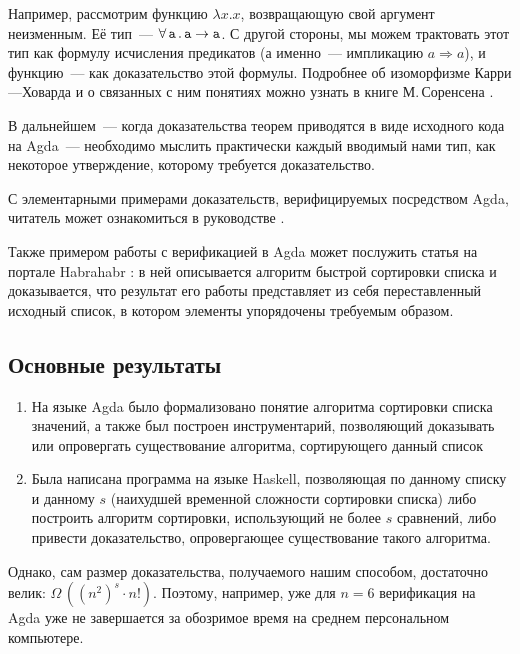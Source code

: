 \abz Например, рассмотрим функцию $\lambda x.x$, возвращающую свой аргумент неизменным. Её тип~— $\mathtt{\forall\,a\,.\,a \rightarrow a}$. С другой стороны, мы можем трактовать этот тип как формулу исчисления предикатов (а именно~— импликацию $a \Rightarrow a$), и функцию~— как доказательство этой формулы. Подробнее об изоморфизме Карри—Ховарда и о связанных с ним понятиях можно узнать в книге М.\,Соренсена \cite{Sorensen}.

\abz В дальнейшем~— когда доказательства теорем приводятся в виде исходного кода на Agda~— необходимо мыслить практически каждый вводимый нами тип, как некоторое утверждение, которому требуется доказательство.

\abz С элементарными примерами доказательств, верифицируемых посредством Agda, читатель может ознакомиться в руководстве \cite{ELTE}.

\abz Также примером работы с верификацией в Agda может послужить статья \linebreak на портале Habrahabr \cite{Habrahabr}: в ней описывается алгоритм быстрой сортировки списка и доказывается, что результат его работы представляет из себя переставленный исходный список, в котором элементы упорядочены требуемым образом.

\subsection
[Основные результаты. Решение задачи и поиск аномалий]
{Основные результаты}

\begin{enumerate}
\item На языке Agda было формализовано понятие алгоритма сортировки списка значений, а также был построен инструментарий, позволяющий доказывать или опровергать существование алгоритма, сортирующего данный список\scolon

\item Была написана программа на языке Haskell, позволяющая по данному списку и данному $s$ (наихудшей временной сложности сортировки списка) либо построить  алгоритм сортировки, использующий не более $s$ сравнений, либо привести доказательство, опровергающее существование такого алгоритма.
\end{enumerate}

Однако, сам размер доказательства, получаемого нашим способом, достаточно велик: $\Omega\,((n^2)^s \cdot n!)$. Поэтому, например, уже для $n=6$ верификация на Agda уже не завершается за обозримое время на среднем персональном компьютере.

